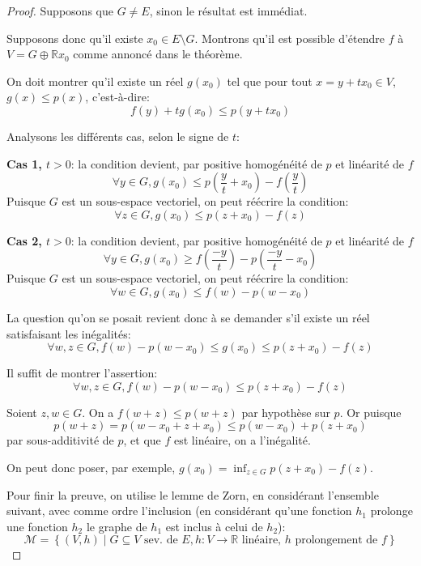 \begin{proof}
  Supposons que $G\neq E$, sinon le résultat est immédiat.

  Supposons donc qu'il existe $x_0\in E\setminus G$. Montrons
  qu'il est possible d'étendre $f$ à $V = G\oplus \mathbb{R}x_0$
  comme annoncé dans le théorème.

  On doit montrer qu'il existe un réel $g(x_0)$ tel que pour
  tout $x = y+tx_0\in V$, $g(x)\leq p(x)$, c'est-à-dire:
  $$f(y) + t g(x_0)\leq p(y + tx_0)$$

  Analysons les différents cas, selon le signe de $t$:

  \textbf{Cas 1, $t>0$}: la condition devient, par positive
  homogénéité de $p$ et linéarité de $f$
  $$\forall y\in G, g(x_0)\leq p\left(\frac{y}{t} + x_0\right)
  - f\left(\frac{y}{t}\right)$$
  Puisque $G$ est un sous-espace vectoriel, on peut réécrire la
  condition:
  $$\forall z\in G, g(x_0)\leq p(z + x_0) - f(z)$$

  \textbf{Cas 2, $t>0$}: la condition devient, par positive
  homogénéité de $p$ et linéarité de $f$
  $$\forall y\in G, g(x_0)\geq  f\left(\frac{-y}{t}\right)
  - p\left(\frac{-y}{t} - x_0\right)$$
  Puisque $G$ est un sous-espace vectoriel, on peut réécrire la
  condition:
  $$\forall w\in G, g(x_0)\leq f(w) - p(w - x_0) $$

  La question qu'on se posait revient donc à se demander s'il existe
  un réel satisfaisant les inégalités:
  $$\forall w, z\in G, f(w) - p(w - x_0)\leq g(x_0)\leq p(z + x_0) - f(z)$$

  Il suffit de montrer l'assertion:
  $$\forall w, z\in G, f(w) - p(w - x_0)\leq p(z + x_0) - f(z)$$

  Soient $z, w\in G$. On a $f(w + z)\leq p(w+z)$ par hypothèse
  sur $p$. Or puisque $$p(w + z)= p(w - x_0 + z +x_0)
  \leq p(w - x_0) + p(z + x_0)$$ par sous-additivité de $p$,
  et que $f$ est linéaire, on a l'inégalité.

  On peut donc poser, par exemple,
  $g(x_0)=\inf_{z\in G}p(z+x_0)-f(z)$.

  Pour finir la preuve, on utilise le lemme de Zorn, en considérant
  l'ensemble suivant, avec comme ordre l'inclusion (en considérant
  qu'une fonction $h_1$ prolonge une fonction $h_2$ \ssi{} le
  graphe de $h_1$ est inclus à celui de $h_2$):
  $$\mathcal{M}= \left\{(V, h)\mid G\subseteq V\mbox{ sev. de $E$},
    h: V\to\mathbb{R} \mbox{ linéaire, $h$ prolongement de $f$}\right\}$$
\end{proof}

